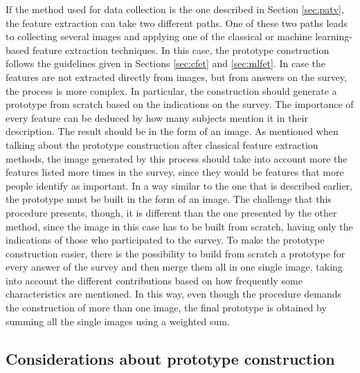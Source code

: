 \documentclass[conference]{IEEEtran}
\begin{document}
			\noindent If the method used for data collection is the one described in Section \ref{sec:patv}, the feature extraction can take two different paths. One of these two paths leads to collecting 
			several images and applying one of the classical or machine learning-based feature extraction techniques. In this case, the prototype construction follows the guidelines given in Sections \ref{sec:cfet} and \ref{sec:mlfet}.
			In case the features are not extracted directly from images, but from answers on the survey, the process is more complex. In particular, the construction should generate a prototype from 
			scratch based on the indications on the survey. The importance of every feature can be deduced by how many subjects mention it in their description. The result should be in the form of an image. 
			As mentioned when talking about the prototype construction after classical feature extraction methods, the image generated by this process should take into account more the features listed more 
			times in the survey, since they would be features that more people identify as important. In a way similar to the one that is described earlier, the prototype must be built in the form of an image. 
			The challenge that this procedure presents, though, it is different than the one presented by the other method, since the image in this case has to be built from scratch, having only the indications of 
			those who participated to the survey. To make the prototype construction easier, there is the possibility to build from scratch a prototype for every answer of the survey and then merge them all in one 
			single image, taking into account the different contributions based on how frequently some characteristics are mentioned. In this way, even though the procedure demands the construction of more than one 
			image, the final prototype is obtained by summing all the single images using a weighted sum.
		 
		
		\subsection{Considerations about prototype construction\label{sec:cpc}}
		
\end{document}
